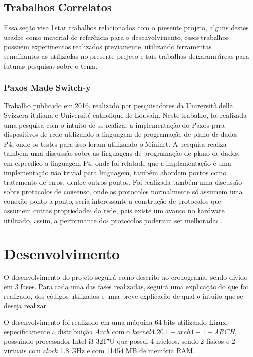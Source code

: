 \documentclass[12pt,
openright, 
oneside,
a4paper,
brazil]{facom-ufu-abntex2}
\theoremstyle{definition}
\begin{document}
\section{Trabalhos Correlatos}
Essa seção visa listar trabalhos relacionados com o presente projeto, alguns destes usados
como material de referência para o desenvolvimento, esses trabalhos possuem experimentos
realizados previamente, utilizando ferramentas semelhantes as utilizadas no presente projeto 
e tais trabalhos deixaram áreas para futuras pesquisas sobre o tema.

\subsection{Paxos Made Switch-y}
Trabalho publicado em 2016, realizado por pesquisadores da Università della Svizzera italiana
e Université catholique de Louvain. Neste trabalho, foi realizada uma pesquisa com o intuito
de se realizar a implementação do Paxos para dispositivos de rede utilizando a linguagem
de programação de plano de dados P4, onde os testes para isso foram utilizando o Mininet. 
A pesquisa realiza também uma discussão sobre as linguagens de programação de plano de dados,
em específico a linguagem P4, onde foi relatado que a implementação é uma
implementação não trivial para linguagem, também abordam pontos como tratamento de erros,
dentre outros pontos. Foi realizada também uma discussão sobre protocolos de consenso,
onde os protocolos normalmente só assumem uma conexão ponto-a-ponto, seria interessante a
construção de protocolos que assumem outras propriedades da rede, pois existe um avanço
no hardware utilizado, assim, a performance dos protocolos poderiam ser melhoradas 
\citep{dang2016paxos}.

\chapter{Desenvolvimento}
O desenvolvimento do projeto seguirá como descrito no cronograma, sendo divido em 
3 fases. Para cada uma das fases realizadas, seguirá uma explicação do que foi realizado,
dos códigos utilizados e uma breve explicação de qual o intuito que se deseja realizar.

O desenvolvimento foi realizado em uma máquina 64 bits utilizando Linux, especificamente a 
distribuição $Arch$ com o $kernel 4.20.1-arch1-1-ARCH$, possuindo processador Intel i3-3217U
que possui 4 núcleos, sendo 2 físicos e 2 virtuais com $clock$ 1.8 GHz e com 11454 MB de 
memória RAM.
\end{document}
